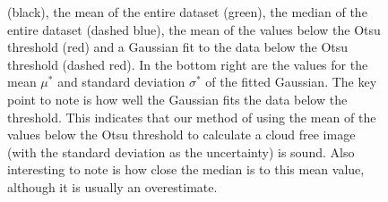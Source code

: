\begin{figure}
{    (black), the mean of the entire dataset (green), the median of the
    entire dataset (dashed blue), the mean of the values below the
    Otsu threshold (red) and a Gaussian fit to the data below the Otsu
    threshold (dashed red). In the bottom right are the values for the
    mean $\mu^*$ and standard deviation $\sigma^*$ of the fitted
    Gaussian. The key point to note is how well the Gaussian fits the
    data below the threshold. This indicates that our method of using
    the mean of the values below the Otsu threshold to calculate a
    cloud free image (with the standard deviation as the uncertainty)
    is sound. Also interesting to note is how close the median is to
    this mean value, although it is usually an overestimate.}
  \label{fig:pix_d}
\end{figure}


